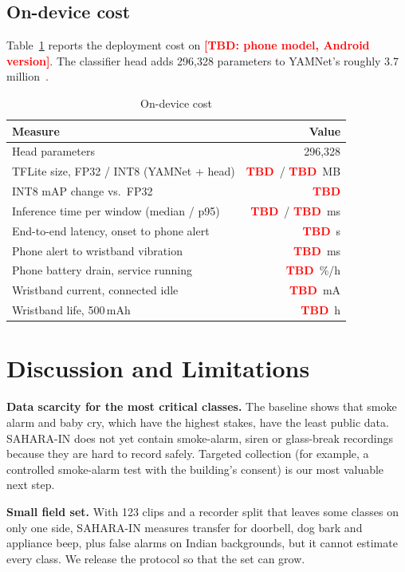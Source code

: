 \documentclass[conference]{IEEEtran}
\newcommand{\TBD}[1]{\textcolor{red}{\textbf{[TBD: #1]}}}
\newcommand{\tbd}{\textcolor{red}{\textbf{TBD}}}
\begin{document}
\subsection{On-device cost}
Table~\ref{tab:device} reports the deployment cost on \TBD{phone model, Android version}. The classifier head adds 296,328 parameters to YAMNet's roughly 3.7 million~\cite{yamnet}.

\begin{table}[t]
\caption{On-device cost}
\label{tab:device}
\centering\footnotesize
\begin{tabular}{@{}lr@{}}
\toprule
Measure & Value \\
\midrule
Head parameters & 296,328 \\
TFLite size, FP32 / INT8 (YAMNet + head) & \tbd\ / \tbd\ MB \\
INT8 mAP change vs.\ FP32 & \tbd \\
Inference time per window (median / p95) & \tbd\ / \tbd\ ms \\
End-to-end latency, onset to phone alert & \tbd\ s \\
Phone alert to wristband vibration & \tbd\ ms \\
Phone battery drain, service running & \tbd\ \%/h \\
Wristband current, connected idle & \tbd\ mA \\
Wristband life, 500\,mAh & \tbd\ h \\
\bottomrule
\end{tabular}
\end{table}

\section{Discussion and Limitations}\label{sec:limits}
\textbf{Data scarcity for the most critical classes.} The baseline shows that smoke alarm and baby cry, which have the highest stakes, have the least public data. SAHARA-IN does not yet contain smoke-alarm, siren or glass-break recordings because they are hard to record safely. Targeted collection (for example, a controlled smoke-alarm test with the building's consent) is our most valuable next step.

\textbf{Small field set.} With 123 clips and a recorder split that leaves some classes on only one side, SAHARA-IN measures transfer for doorbell, dog bark and appliance beep, plus false alarms on Indian backgrounds, but it cannot estimate every class. We release the protocol so that the set can grow.
\end{document}
